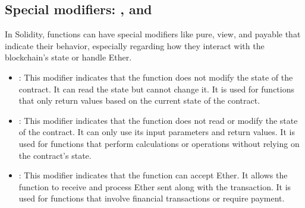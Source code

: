 \subsection{Special modifiers: ,  and }
\label{sec:special-modifiers}
In Solidity, functions can have special modifiers like pure, view, and payable that indicate their behavior, especially regarding how they interact with the blockchain's state or handle Ether.

\begin{itemize}
    \item {}: This modifier indicates that the function does not modify the state of the contract. It can read the state but cannot change it. It is used for functions that only return values based on the current state of the contract.
    \item {}: This modifier indicates that the function does not read or modify the state of the contract. It can only use its input parameters and return values. It is used for functions that perform calculations or operations without relying on the contract's state.
    \item {}: This modifier indicates that the function can accept Ether. It allows the function to receive and process Ether sent along with the transaction. It is used for functions that involve financial transactions or require payment.
\end{itemize}


